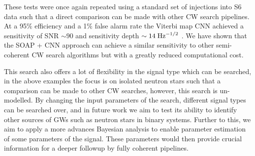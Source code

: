%
These tests were once again repeated using a standard set of injections into S6
data such that a direct comparison can be made with other \gls{CW} search
pipelines. At a 95\% efficiency and a 1\% false alarm rate the Viterbi map
\gls{CNN} achieved a sensitivity of \gls{SNR} $ \sim 90$ and sensitivity depth
$\sim 14 \; \rm{Hz}^{-1/2}$ . We have shown that the SOAP + \gls{CNN} approach
can achieve a similar sensitivity to other semi-coherent \gls{CW} search
algorithms but with a greatly reduced computational cost.

%
This search also offers a lot of flexibility in the signal type which can be
searched, in the above examples the focus is on isolated neutron stars such
that a comparison can be made to other \gls{CW} searches, however, this search
is un-modelled. By changing the input parameters of the search, different
signal types can be searched over, and in future work we aim to test its
ability to identify other sources of \glspl{GW} such as neutron stars in binary systems.
Further to this, we aim to apply a more advances Bayesian analysis to enable parameter estimation of some parameters of the signal.
These parameters would then provide crucial information for a deeper followup by fully coherent pipelines. 





